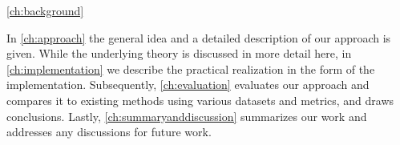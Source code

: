 \autoref{ch:background}

In \autoref{ch:approach} the general idea and a detailed description of our approach is given.
While the underlying theory is discussed in more detail here, in \autoref{ch:implementation} we describe the practical realization in the form of the implementation.
Subsequently, \autoref{ch:evaluation} evaluates our approach and compares it to existing methods using various datasets and metrics, and draws conclusions.
Lastly, \autoref{ch:summaryanddiscussion} summarizes our work and addresses any discussions for future work.



